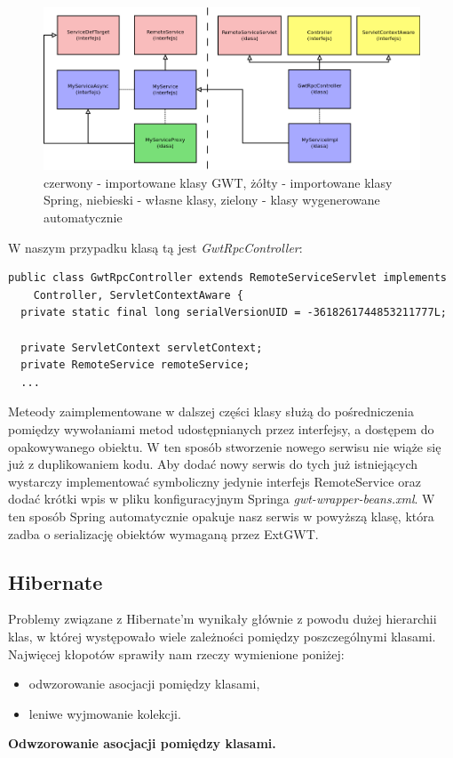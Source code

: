 \documentclass[licencjacka]{pracamgr}
\begin{document}
\begin{figure}[ht!]
\centering
\includegraphics[width=\textwidth]{resources/gwt_spring_2.png}
\caption{czerwony - importowane klasy GWT, żółty - importowane klasy Spring, niebieski - własne klasy, zielony - klasy wygenerowane automatycznie}
\end{figure}

W naszym przypadku klasą tą jest \textit{GwtRpcController}: 
\begin{verbatim}
public class GwtRpcController extends RemoteServiceServlet implements
    Controller, ServletContextAware {
  private static final long serialVersionUID = -3618261744853211777L;
          
  private ServletContext servletContext;
  private RemoteService remoteService;
  ...
\end{verbatim}
Meteody zaimplementowane w dalszej części klasy służą do pośredniczenia pomiędzy wywołaniami metod udostępnianych przez interfejsy, a dostępem do opakowywanego obiektu. W ten sposób stworzenie nowego serwisu nie wiąże się już z duplikowaniem kodu. Aby dodać nowy serwis do tych już istniejących wystarczy implementować symboliczny jedynie interfejs RemoteService oraz dodać krótki wpis w pliku konfiguracyjnym Springa \textit{gwt-wrapper-beans.xml}. W ten sposób Spring automatycznie opakuje nasz serwis w powyższą klasę, która zadba o serializację obiektów wymaganą przez ExtGWT. 

\subsection{Hibernate}
Problemy związane z Hibernate'm wynikały głównie z powodu dużej hierarchii klas, w której występowało wiele zależności pomiędzy poszczególnymi klasami. 
Najwięcej kłopotów sprawiły nam rzeczy wymienione poniżej:
\begin{itemize}
\item odwzorowanie asocjacji pomiędzy klasami,
\item leniwe wyjmowanie kolekcji.
\end{itemize}
\textbf{Odwzorowanie asocjacji pomiędzy klasami.}
\end{document}
